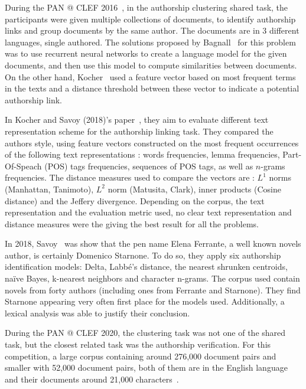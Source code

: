During the PAN @ CLEF 2016~\cite{pan16}, in the authorship clustering shared task, the participants were given multiple collections of documents, to identify authorship links and group documents by the same author.
The documents are in 3 different languages, single authored.
The solutions proposed by Bagnall~\cite{bagnall_pan16} for this problem was to use recurrent neural networks to create a language model for the given documents, and then use this model to compute similarities between documents.
On the other hand, Kocher~\cite{kocher_pan16} used a feature vector based on most frequent terms in the texts and a distance threshold between these vector to indicate a potential authorship link.

In Kocher and Savoy (2018)'s paper~\cite{kocher_linking}, they aim to evaluate different text representation scheme for the authorship linking task.
They compared the authors style, using feature vectors constructed on the most frequent occurrences of the following text representations : words frequencies, lemma frequencies, Part-Of-Speach (POS) tags frequencies, sequences of POS tags, as well as $n$-grams frequencies.
The distance measures used to compare the vectors are : $L^1$ norms (Manhattan, Tanimoto), $L^2$ norm (Matusita, Clark), inner products (Cosine distance) and the Jeffery divergence.
Depending on the corpus, the text representation and the evaluation metric used, no clear text representation and distance measures were the giving the best result for all the problems.

In 2018, Savoy~\cite{savoy_starnone} was show that the pen name Elena Ferrante, a well known novels author, is certainly Domenico Starnone.
To do so, they apply six authorship identification models: Delta, Labbé's distance, the nearest shrunken centroids, naïve Bayes, k-nearest neighbors and character n-grams.
The corpus used contain novels from forty authors (including ones from Ferrante and Starnone).
They find Starnone appearing very often first place for the models used.
Additionally, a lexical analysis was able to justify their conclusion.

During the PAN @ CLEF 2020, the clustering task was not one of the shared task, but the closest related task was the authorship verification.
For this competition, a large corpus containing around 276,000 document pairs and smaller with 52,000 document pairs, both of them are in the English language and their documents around 21,000 characters~\cite{overview_pan20}.

